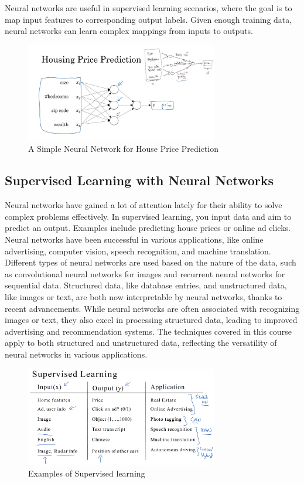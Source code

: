 \documentclass[letterpaper,12pt,notitlepage,twoside]{report}
\begin{document}
Neural networks are useful in supervised learning scenarios, where the goal is to map input features to corresponding output labels. Given enough training data, neural networks can learn complex mappings from inputs to outputs.

\begin{figure}[h]
	\centering
	\includegraphics[width=0.75\textwidth]{Images/Simple Neural Network.png}
	\caption{A Simple Neural Network for House Price Prediction}
	\label{fig:1}
\end{figure}
\FloatBarrier

\subsection{Supervised Learning with Neural Networks}
Neural networks have gained a lot of attention lately for their ability to solve complex problems effectively. In supervised learning, you input data and aim to predict an output. Examples include predicting house prices or online ad clicks. Neural networks have been successful in various applications, like online advertising, computer vision, speech recognition, and machine translation. Different types of neural networks are used based on the nature of the data, such as convolutional neural networks for images and recurrent neural networks for sequential data. Structured data, like database entries, and unstructured data, like images or text, are both now interpretable by neural networks, thanks to recent advancements. While neural networks are often associated with recognizing images or text, they also excel in processing structured data, leading to improved advertising and recommendation systems. The techniques covered in this course apply to both structured and unstructured data, reflecting the versatility of neural networks in various applications.

\begin{figure}[h]
	\centering
	\includegraphics[width=0.75\textwidth]{Images/Supervised learning.png}
	\caption{Examples of Supervised learning}
	\label{fig:2}
\end{figure}
\end{document}
